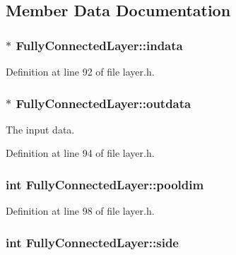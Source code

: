 \subsection{Member Data Documentation}
\hypertarget{class_fully_connected_layer_aa06f43fdb5f8d9bd9ae2f4501d5eea72}{
\subsubsection[{indata}]{$\ast$ Fully\+Connected\+Layer\+::indata}}\label{class_fully_connected_layer_aa06f43fdb5f8d9bd9ae2f4501d5eea72}


Definition at line 92 of file layer.\+h.

\hypertarget{class_fully_connected_layer_ab0c96334144a37e63b4c09744fa0e1dc}{
\subsubsection[{outdata}]{$\ast$ Fully\+Connected\+Layer\+::outdata}}\label{class_fully_connected_layer_ab0c96334144a37e63b4c09744fa0e1dc}


The input data. 



Definition at line 94 of file layer.\+h.

\hypertarget{class_fully_connected_layer_ac681095a1af7645162fedd5e20123e35}{
\subsubsection[{pooldim}]{\setlength{\rightskip}{0pt plus 5cm}int Fully\+Connected\+Layer\+::pooldim}}\label{class_fully_connected_layer_ac681095a1af7645162fedd5e20123e35}


Definition at line 98 of file layer.\+h.

\hypertarget{class_fully_connected_layer_adff134355829fd3e2944b7b304c6bd0f}{
\subsubsection[{side}]{\setlength{\rightskip}{0pt plus 5cm}int Fully\+Connected\+Layer\+::side}}\label{class_fully_connected_layer_adff134355829fd3e2944b7b304c6bd0f}


